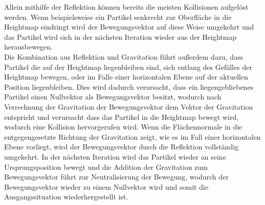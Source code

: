 \begin{Spacing}{\mylinespace}
		Allein mithilfe der Reflektion können bereits die meisten Kollisionen
		aufgelöst werden. Wenn beispielsweise ein Partikel senkrecht zur Oberfläche
		in die Heightmap eindringt wird der Bewegungsvektor auf diese Weise umgekehrt
		und das Partikel wird sich in der nächsten Iteration wieder aus der Heightmap
		herausbewegen.
		\\Die Kombination aus Reflektion und Gravitation führt außerdem dazu, dass
		Partikel die auf der Heightmap liegenbleiben sind, sich entlang des Gefälles
		der Heightmap bewegen, oder im Falle einer horizontalen Ebene auf der aktuellen Position liegenbleiben.
		Dies wird dadurch verursacht, dass ein liegengebliebenes
		Partikel einen Nullvektor als Bewegungsvektor besitzt, wodurch nach Verrechnung der
		Gravitation der Bewegungsvektor dem Vektor der Gravitation entspricht und
		verursacht dass das Partikel in die Heightmap bewegt wird, wodurch eine Kollision hervorgerufen wird.
		Wenn die Flächennormale in die entgegengesetzte Richtung der Gravitation
		zeigt, wie es im Fall einer horizontalen Ebene vorliegt, wird der
		Bewegungsvektor durch die Reflektion vollständig umgekehrt.
		In der nächsten Iteration wird das Partikel wieder an seine
		Ursprungsposition bewegt und die Addition der Gravitation zum Bewegungsvektor führt zur
		Neutralisierung der Bewegung, wodurch der Bewegungsvektor wieder
		zu einem Nullvektor wird und somit die Ausgangssituation wiederhergestellt ist.


\end{Spacing}
